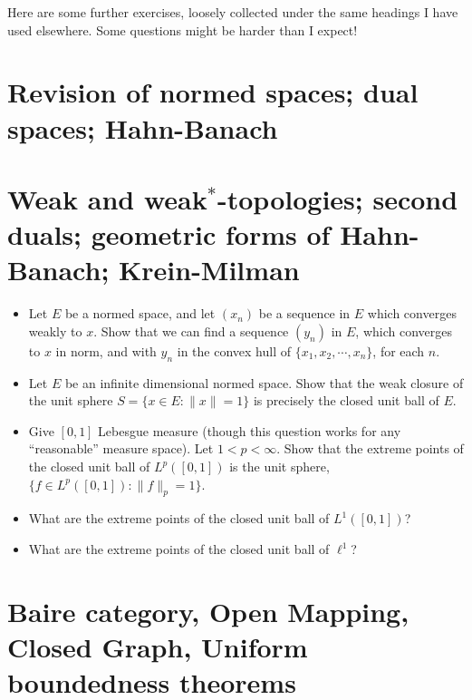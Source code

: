 \documentclass[twoside,12pt,a4paper]{article}
\begin{document}

\bigskip

Here are some further exercises, loosely collected under the same
headings I have used elsewhere.  Some questions might be harder than
I expect!

\section{Revision of normed spaces; dual spaces; Hahn-Banach}





\section{Weak and weak$^*$-topologies; second duals; geometric forms of
Hahn-Banach; Krein-Milman}

\begin{itemize}
\item Let $E$ be a normed space, and let $(x_n)$ be a sequence in $E$ which
converges weakly to $x$.  Show that we can find a sequence $(y_n)$ in $E$,
which converges to $x$ in norm, and with $y_n$ in the convex hull of
$\{ x_1,x_2,\cdots,x_n \}$, for each $n$.
\item Let $E$ be an infinite dimensional normed space.  Show that the 
weak closure of the unit sphere $S=\{ x\in E : \|x\|=1\}$ is precisely
the closed unit ball of $E$.
\item Give $[0,1]$ Lebesgue measure (though this question works for
any ``reasonable'' measure space).  Let $1<p<\infty$.  Show that the
extreme points of the closed unit ball of $L^p([0,1])$ is the
unit sphere, $\{ f\in L^p([0,1]) : \|f\|_p=1\}$.
\item What are the extreme points of the closed unit ball of $L^1([0,1])$?
\item What are the extreme points of the closed unit ball of $\ell^1$?
\end{itemize}


\section{Baire category, Open Mapping, Closed Graph, Uniform boundedness
theorems}
\end{document}

